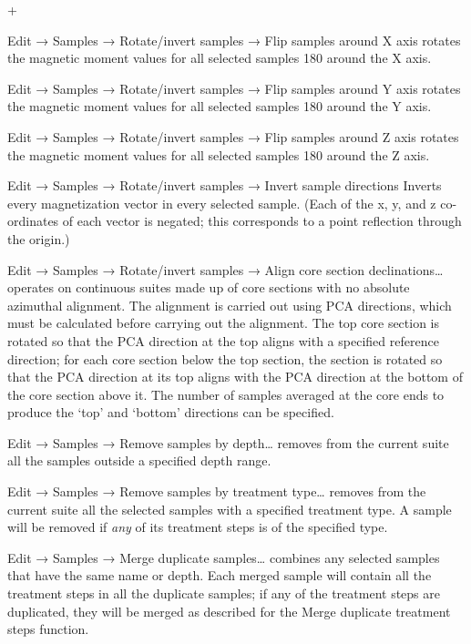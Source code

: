 \documentclass[a4paper,british]{article}
\newcommand{\menuitemlabel}[1]{%
\mbox{\textsf{#1}}\hfil}
\newenvironment{menuitemlist}%
{\begin{list}{}{%
\renewcommand{\makelabel}{\menuitemlabel}%
\setlength{\labelwidth}{35pt}%
\setlength{\leftmargin}%
             {\labelwidth+\labelsep}}}%
{\end{list}}
\newcommand{\ppcmd}[1]{\textsf{#1}} %
\newcommand{\submenu}{ \textrm{→} }
\begin{document}
\begin{menuitemlist}
\item[Edit\submenu Samples\submenu Rotate/invert samples\submenu Flip
  samples around X axis] rotates the magnetic moment values for all
  selected samples 180\textdegree{} around the X axis.

\item[Edit\submenu Samples\submenu Rotate/invert samples\submenu Flip
  samples around Y axis] rotates the magnetic moment values for all
  selected samples 180\textdegree{} around the Y axis.

\item[Edit\submenu Samples\submenu Rotate/invert samples\submenu Flip
  samples around Z axis] rotates the magnetic moment values for all
  selected samples 180\textdegree{} around the Z axis.

\item[Edit\submenu Samples\submenu Rotate/invert samples\submenu Invert
  sample directions] Inverts every magnetization vector in every
  selected sample. (Each of the x, y, and z co-ordinates of each vector
  is negated; this corresponds to a point reflection through the
  origin.)

\item[Edit\submenu Samples\submenu Rotate/invert samples\submenu Align
  core section declinations\ldots] operates on continuous suites made up
  of core sections with no absolute azimuthal alignment. The alignment
  is carried out using PCA directions, which must be calculated before
  carrying out the alignment. The top core section is rotated so that
  the PCA direction at the top aligns with a specified reference
  direction; for each core section below the top section, the section is
  rotated so that the PCA direction at its top aligns with the PCA
  direction at the bottom of the core section above it. The number of
  samples averaged at the core ends to produce the `top' and `bottom'
  directions can be specified.

\item[Edit\submenu Samples\submenu Remove samples by depth\ldots]
  removes from the current suite all the samples outside a specified
  depth range.

\item[Edit\submenu Samples\submenu Remove samples by treatment
  type\ldots] removes from the current suite all the selected samples
  with a specified treatment type. A sample will be removed if
  \emph{any} of its treatment steps is of the specified type.

\item[Edit\submenu Samples\submenu Merge duplicate samples\ldots]
  combines any selected samples that have the same name or depth.
  Each merged sample will contain all the treatment steps in all
  the duplicate samples; if any of the treatment steps are duplicated,
  they will be merged as described for the \ppcmd{Merge duplicate
  treatment steps} function.
  

\end{menuitemlist}
\end{document}
